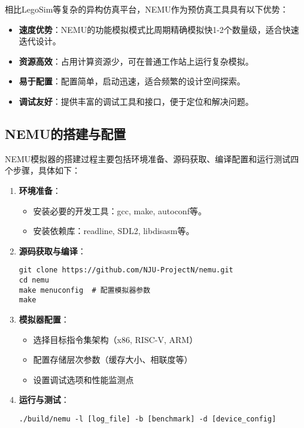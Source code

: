 \documentclass[bachelor]{thesis-uestc}
\begin{document}
相比LegoSim等复杂的异构仿真平台，NEMU作为预仿真工具具有以下优势：
\begin{itemize}
    \item \textbf{速度优势}：NEMU的功能模拟模式比周期精确模拟快1-2个数量级，适合快速迭代设计。
    \item \textbf{资源高效}：占用计算资源少，可在普通工作站上运行复杂模拟。
    \item \textbf{易于配置}：配置简单，启动迅速，适合频繁的设计空间探索。
    \item \textbf{调试友好}：提供丰富的调试工具和接口，便于定位和解决问题。
\end{itemize}

\subsection{NEMU的搭建与配置}
NEMU模拟器的搭建过程主要包括环境准备、源码获取、编译配置和运行测试四个步骤，具体如下：

\begin{enumerate}
    \item \textbf{环境准备}：
    \begin{itemize}
        \item 安装必要的开发工具：gcc, make, autoconf等。
        \item 安装依赖库：readline, SDL2, libdisasm等。
    \end{itemize}

    \item \textbf{源码获取与编译}：
    \begin{verbatim}
git clone https://github.com/NJU-ProjectN/nemu.git
cd nemu
make menuconfig  # 配置模拟器参数
make
    \end{verbatim}

    \item \textbf{模拟器配置}：
    \begin{itemize}
        \item 选择目标指令集架构（x86, RISC-V, ARM）
        \item 配置存储层次参数（缓存大小、相联度等）
        \item 设置调试选项和性能监测点
    \end{itemize}

    \item \textbf{运行与测试}：
    \begin{verbatim}
./build/nemu -l [log_file] -b [benchmark] -d [device_config]
    \end{verbatim}
\end{enumerate}
\end{document}
